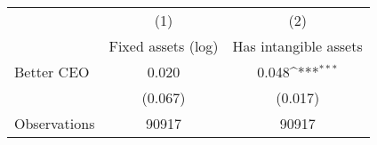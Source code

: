 {
\def\sym#1{\ifmmode^{#1}\else\(^{#1}\)\fi}
\begin{tabular}{l*{2}{c}}
\hline\hline
                    &\multicolumn{1}{c}{(1)}&\multicolumn{1}{c}{(2)}\\
                    &\multicolumn{1}{c}{Fixed assets (log)}&\multicolumn{1}{c}{Has intangible assets}\\
\hline
Better CEO          &       0.020         &       0.048\sym{***}\\
                    &     (0.067)         &     (0.017)         \\
\hline
Observations        &       90917         &       90917         \\
\hline\hline
\end{tabular}
}
